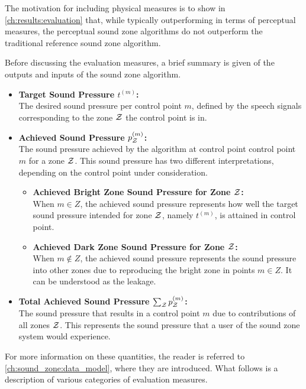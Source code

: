 The motivation for including physical measures is to show in \autoref{ch:results:evaluation} that, 
while typically outperforming in terms of perceptual measures, the perceptual sound zone algorithms do not 
outperform the traditional reference sound zone algorithm. 

Before discussing the evaluation measures, a brief summary is given of the outputs and inputs of the sound zone algorithm.
\begin{itemize}
    \item \textbf{Target Sound Pressure $t^{(m)}$:}\\
        The desired sound pressure per control point $m$, defined by the speech signals 
        corresponding to the zone $\mathcal{Z}$ the control point is in.
    \item \textbf{Achieved Sound Pressure $p_{\mathcal{Z}}^{(m)}$:}\\
        The sound pressure achieved by the algorithm at control point control point $m$ for a zone $\mathcal{Z}$.
        This sound pressure has two different interpretations, depending on the control point under consideration.
        \begin{itemize}
            \item \textbf{Achieved Bright Zone Sound Pressure for Zone $\mathcal{Z}$:}\\
                When $m \in Z$, the achieved sound pressure represents how well the target sound pressure 
                intended for zone $\mathcal{Z}$, namely $t^{(m)}$,  is attained in control point.
            \item \textbf{Achieved Dark Zone Sound Pressure for Zone $\mathcal{Z}$:}\\
                When $m \notin Z$, the achieved sound pressure represents the sound pressure 
                into other zones due to reproducing the bright zone in points $m \in Z$.
                It can be understood as the leakage.
        \end{itemize}
    \item \textbf{Total Achieved Sound Pressure $\sum_{\mathcal{Z}} p_{\mathcal{Z}}^{(m)}$:}\\
        The sound pressure that results in a control point $m$ due to contributions of all zones $\mathcal{Z}$.
        This represents the sound pressure that a user of the sound zone system would experience.
\end{itemize}
For more information on these quantities, the reader is referred to \autoref{ch:sound_zone:data_model}, where they 
are introduced.
What follows is a description of various categories of evaluation measures.

